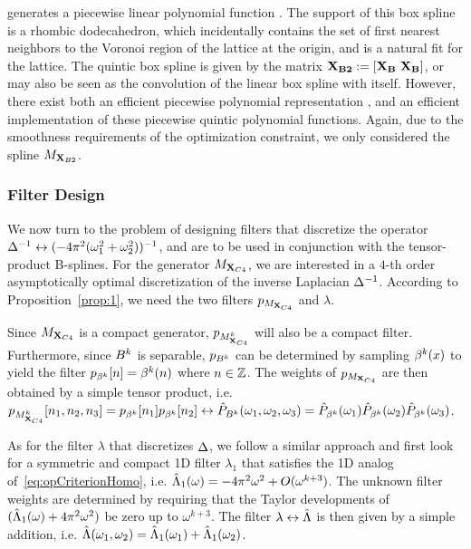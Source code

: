 generates a piecewise linear polynomial function \cite{practicalbox}. The support of this box spline is a rhombic dodecahedron, which incidentally contains the set of first nearest neighbors to the Voronoi region of the lattice at the origin, and is a natural fit for the lattice. The quintic box spline is given by the matrix $\mathbf{\mathbf{X}_{B2}} := \left[\mathbf{\mathbf{X}_{B}} \ \mathbf{\mathbf{X}_{B}}\right]$, or may also be seen as the convolution of the linear box spline with itself.  However, there exist both an efficient piecewise polynomial representation \cite{practicalbox}, and an efficient implementation \cite{fastbox} of these piecewise quintic polynomial functions. Again, due to the smoothness requirements of the optimization constraint, we only considered the spline $M_{\mathbf{X}_{B2}}$.

\subsubsection{Filter Design}
\label{sec:poissonFilterDesign}

We now turn to the problem of designing filters that discretize the operator 
$\mathop{\Delta^{-1}} \leftrightarrow (-4\pi^2(\omega_1^2 +\omega_2^2))^{-1}$, and are to be used in conjunction with the tensor-product B-splines. For the generator $M_{\mathbf{X}_{C4}}$, we are interested in a $4$-th order asymptotically optimal discretization of the inverse Laplacian $\mathop{\Delta^{-1}}$. According to Proposition~\ref{prop:1}, we need the two filters $p_{M_{\mathbf{X}_{C4}}}$ and $\lambda$.

Since $M_{\mathbf{X}_{C4}}$ is a compact generator, $p_{M_{\mathbf{X}_{C4}}^k}$ will also be a compact filter. Furthermore, since $B^k$ is separable, $p_{B^k}$ can be
determined by sampling $\beta^k(x)$ to yield the filter $p_{\beta^k}[n] =
\beta^k(n)$ where $n \in \mathbb{Z}$. The weights of $p_{M_{\mathbf{X}_{C4}}}$ are then obtained
by a simple tensor product, i.e. $p_{M_{\mathbf{X}_{C4}}^k}[n_1,n_2,n_3] =
p_{\beta^k}[n_1]p_{\beta^k}[n_2] \leftrightarrow \hat{P}_{B^k}(\omega_1,\omega_2,\omega_3) = \hat{P}_{\beta^k}(\omega_1)\hat{P}_{\beta^k}(\omega_2)\hat{P}_{\beta^k}(\omega_3)$.

As for the filter $\lambda$ that discretizes $\mathop{\Delta}$, we follow a
similar approach and first look for a symmetric and compact 1D filter
$\lambda_1$ that satisfies the 1D analog of~\eqref{eq:opCriterionHomo},
i.e. $\hat{\Lambda}_1(\omega) = -4\pi^2\omega^2 + O(\omega^{k+3})$. The
unknown filter weights are determined by requiring that the Taylor
developments of $(\hat{\Lambda}_1(\omega) + 4\pi^2\omega^2)$ be zero up to
$\omega^{k+3}$. The filter $\lambda \leftrightarrow \hat{\Lambda}$ is then given by a
simple addition, i.e. $\hat{\Lambda}(\omega_1,\omega_2) =
\hat{\Lambda}_1(\omega_1) + \hat{\Lambda}_1(\omega_2)$. 

